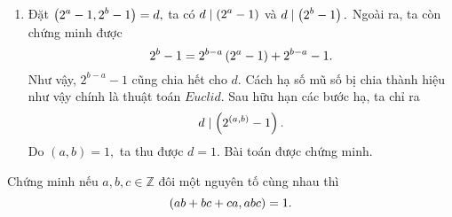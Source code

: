 \begin{bx}
{\begin{enumerate}[a,]
    Phân tích trên chỉ ra cho ta
    $$\left\{\begin{aligned}
         d\mid \tron{a^5+b^5}\\
         d\mid \tron{a^5-b^5}
    \end{aligned}\right.
    \Rightarrow \left\{\begin{aligned}
         d\mid 2a^5\\
         d\mid 2b^5
    \end{aligned}\right.
    \Rightarrow d\mid \tron{2a^5,2b^5}
    \Rightarrow d\mid 2(a,b)^5
    \Rightarrow d\mid 2
    \Rightarrow d\in\{1;2\}.$$
    Bài toán được chứng minh.
    \item Đặt $\left(\displaystyle 2^a -1, 2^b -1 \right) = d,$ ta có $d\mid \left(\displaystyle 2^a-1 \right)$ và $d\mid \left(\displaystyle 2^b-1 \right).$ Ngoài ra, ta còn chứng minh được
    $$2^b-1=2^{b-a}\left(\displaystyle 2^a-1 \right)+2^{b-a}-1.$$
    Như vậy, $2^{b-a}-1$ cũng chia hết cho $d.$ Cách hạ số mũ số bị chia thành hiệu như vậy chính là thuật toán $Euclid.$ Sau hữu hạn các bước hạ, ta chỉ ra
    $$d\mid \left(\displaystyle 2^{(a,b)}-1 \right).$$
    Do $(a,b)=1,$ ta thu được $d=1.$ Bài toán được chứng minh.
\end{enumerate}
}
\end{bx}

\begin{bx}
Chứng minh nếu $a,b,c \in \mathbb{Z}$ đôi một nguyên tố cùng nhau thì \[\left(\displaystyle ab+bc+ca, abc \right) =1.\]
\end{bx}

